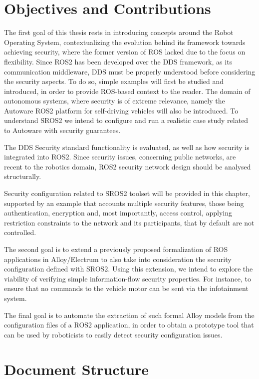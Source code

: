 \section{Objectives and Contributions}

The first goal of this thesis rests in introducing concepts around the Robot Operating System, contextualizing the evolution behind its framework towards achieving security, where the former version of ROS lacked due to the focus on flexibility. Since ROS2 has been developed over the DDS framework, as its communication middleware, DDS must be properly understood before considering the security aspects. To do so, simple examples will first be studied and introduced, in order to provide ROS-based context to the reader. The domain of autonomous systems, where security is of extreme relevance, namely the Autoware \cite{8443742} ROS2 platform for self-driving vehicles will also be introduced. To understand SROS2 we intend to configure and run a realistic case study related to Autoware with security guarantees. 

The DDS Security standard functionality is evaluated, as well as how security is integrated into ROS2. Since security issues, concerning public networks, are recent to the robotics domain, ROS2 security network design should be analysed structurally.

Security configuration related to SROS2 toolset will be provided in this chapter, supported by an example that accounts multiple security features, those being authentication, encryption and, most importantly, access control, applying restriction constraints to the network and its participants, that by default are not controlled.

The second goal is to extend a previously proposed \cite{9341085} formalization of ROS applications in Alloy/Electrum \cite{alloy-6, lwspecification} to also take into consideration the security configuration defined with SROS2. Using this extension, we intend to explore the viability of verifying simple information-flow security properties. For instance, to ensure that no commands to the vehicle motor can be sent via the infotainment system.

The final goal is to automate the extraction of such formal Alloy models from the configuration files of a ROS2 application, in order to obtain a prototype tool that can be used by roboticists to easily detect security configuration issues.

\section{Document Structure}

